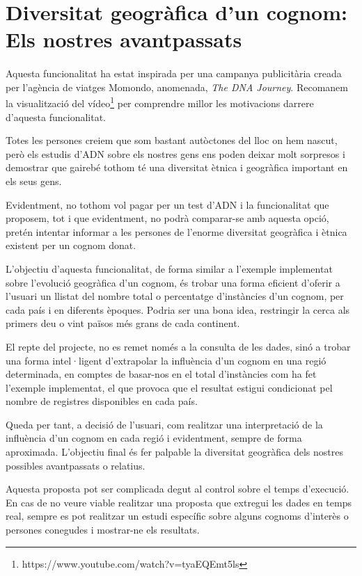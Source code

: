 \section{Diversitat geogràfica d'un cognom: Els nostres avantpassats}

    \paragraph{}
    Aquesta funcionalitat ha estat inspirada per una campanya publicitària creada per l'agència de viatges Momondo, anomenada, \emph{The DNA Journey}. Recomanem la visualització del vídeo\footnote{https://www.youtube.com/watch?v=tyaEQEmt5ls} per comprendre millor les motivacions darrere d'aquesta funcionalitat.

    Totes les persones creiem que som bastant autòctones del lloc on hem nascut, però els estudis d'ADN sobre els nostres gens ens poden deixar molt sorpresos i demostrar que gairebé tothom té una diversitat ètnica i geogràfica important en els seus gens.

    Evidentment, no tothom vol pagar per un test d'ADN i la funcionalitat que proposem, tot i que evidentment, no podrà comparar-se amb aquesta opció, pretén intentar informar a les persones de l’enorme diversitat geogràfica i ètnica existent per un cognom donat.

    L'objectiu d'aquesta funcionalitat, de forma similar a l'exemple implementat sobre l'evolució geogràfica d'un cognom, és trobar una forma eficient d'oferir a l'usuari un llistat del nombre total o percentatge d'instàncies d'un cognom, per cada país i en diferents èpoques. Podria ser una bona idea, restringir la cerca als primers deu o vint països més grans de cada continent.

    El repte del projecte, no es remet només a la consulta de les dades, sinó a trobar una forma intel·ligent d'extrapolar la influència d'un cognom en una regió determinada, en comptes de basar-nos en el total d'instàncies com ha fet l'exemple implementat, el que provoca que el resultat estigui condicionat pel nombre de registres disponibles en cada país.

    Queda per tant, a decisió de l'usuari, com realitzar una interpretació de la influència d'un cognom en cada regió i evidentment, sempre de forma aproximada. L'objectiu final és fer palpable la diversitat geogràfica dels nostres possibles avantpassats o relatius.

    Aquesta proposta pot ser complicada degut al control sobre el temps d'execució. En cas de no veure viable realitzar una proposta que extregui les dades en temps real, sempre es pot realitzar un estudi específic sobre alguns cognoms d'interès o persones conegudes i mostrar-ne els resultats.
